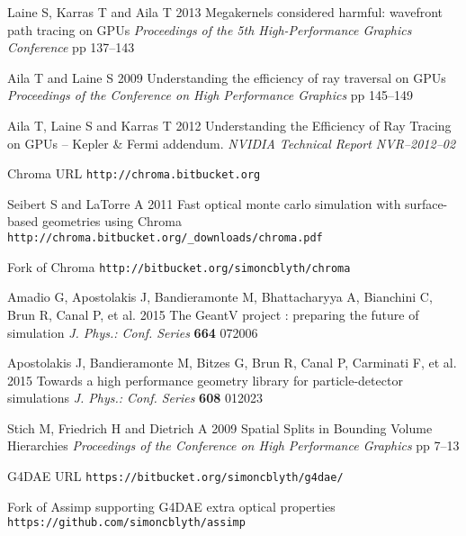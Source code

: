 \documentclass[a4paper]{jpconf}
\begin{document}
\begin{thebibliography}{9}
Laine S, Karras T and Aila T
2013
Megakernels considered harmful: wavefront path tracing on GPUs
{\it Proceedings of the 5th High-Performance Graphics Conference} pp 137--143

Aila T and Laine S 
2009
Understanding the efficiency of ray traversal on GPUs
{\it Proceedings of the Conference on High Performance Graphics} pp 145--149

Aila T, Laine S and Karras T
2012
Understanding the Efficiency of Ray Tracing on GPUs – Kepler \& Fermi addendum. 
{\it NVIDIA Technical Report NVR–2012–02}

Chroma URL {\tt http://chroma.bitbucket.org}

Seibert S and LaTorre A 
2011 
Fast optical monte carlo simulation with surface-based geometries using Chroma {\tt http://chroma.bitbucket.org/\_downloads/chroma.pdf}

Fork of Chroma {\tt http://bitbucket.org/simoncblyth/chroma}

Amadio G, Apostolakis J, Bandieramonte M, Bhattacharyya A, Bianchini C, Brun R, Canal P, et al.
2015
The GeantV project : preparing the future of simulation 
{\it J. Phys.: Conf. Series} {\bf 664} 072006

Apostolakis J, Bandieramonte M, Bitzes G, Brun R, Canal P, Carminati F, et al. 
2015
Towards a high performance geometry library for particle-detector simulations
{\it J. Phys.: Conf. Series} {\bf 608} 012023

Stich M, Friedrich H and Dietrich A 
2009
Spatial Splits in Bounding Volume Hierarchies
{\it Proceedings of the Conference on High Performance Graphics} pp 7--13



G4DAE URL {\tt https://bitbucket.org/simoncblyth/g4dae/}

Fork of Assimp supporting G4DAE extra optical properties {\tt https://github.com/simoncblyth/assimp}


\end{thebibliography}
\end{document}
